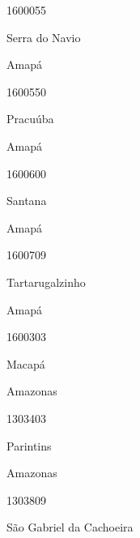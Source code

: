 \documentclass[
  letterpaper,
]{report}
\begin{document}
1600055

\n      

Serra do Navio

\n    

\n    

\n      

Amapá

\n      

1600550

\n      

Pracuúba

\n    

\n    

\n      

Amapá

\n      

1600600

\n      

Santana

\n    

\n    

\n      

Amapá

\n      

1600709

\n      

Tartarugalzinho

\n    

\n    

\n      

Amapá

\n      

1600303

\n      

Macapá

\n    

\n    

\n      

Amazonas

\n      

1303403

\n      

Parintins

\n    

\n    

\n      

Amazonas

\n      

1303809

\n      

São Gabriel da Cachoeira

\n    

\n    
\end{document}
